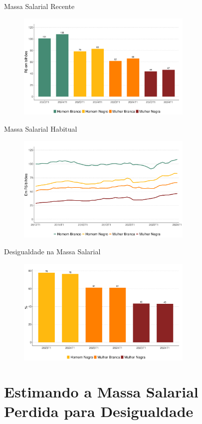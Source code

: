 \documentclass[10pt, xcolor=x11names,compress]{beamer}
\begin{document}
	\begin{frame}{Massa Salarial Recente}
		\begin{figure}
			\centering
			\includegraphics[width = 0.75\textwidth]{figures_output/massa_habitual.pdf}
		\end{figure}
	\end{frame}
	
	\begin{frame}{Massa Salarial Habitual}
		\begin{figure}
			\centering
			\includegraphics[width = 0.75\textwidth]{figures_output/massa_habitual_gen_raca.pdf}
		\end{figure}
	\end{frame}
	
	\begin{frame}{Desigualdade na Massa Salarial}
		\begin{figure}
			\centering
			\includegraphics[width = 0.75\textwidth]{figures_output/frac_massa_habitual.pdf}
		\end{figure}
	\end{frame}		
	
	\section{Estimando a Massa Salarial Perdida para Desigualdade}

	
	
\end{document}
